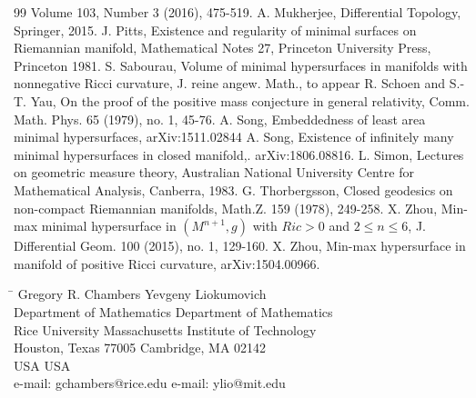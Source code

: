 \documentclass[12pt]{amsart}
\theoremstyle{definition}
\begin{document}
\begin{thebibliography}{99}
Volume 103, Number 3 (2016), 475-519.
 A. Mukherjee, Differential Topology, Springer, 2015.
 J. Pitts, Existence and regularity of minimal surfaces on Riemannian manifold, Mathematical
Notes 27, Princeton University Press, Princeton 1981.
 S. Sabourau, Volume of minimal hypersurfaces in manifolds with nonnegative Ricci curvature, J. reine angew. Math., to appear
 R. Schoen and S.-T. Yau, On the proof of the positive mass conjecture in general relativity, Comm. Math. Phys. 65 (1979), no. 1, 45-76.
  A. Song, Embeddedness of least area minimal hypersurfaces, arXiv:1511.02844
  A. Song, Existence of infinitely many minimal hypersurfaces in closed manifold,. arXiv:1806.08816.
 L. Simon, Lectures on geometric measure theory, Australian National University Centre for
Mathematical Analysis, Canberra, 1983.
  G. Thorbergsson, Closed geodesics on non-compact Riemannian manifolds, Math.Z. 159 (1978), 249-258.
 X. Zhou, Min-max minimal hypersurface in $(M^{n+1}, g)$ with $Ric>0$ and $2 \leq n \leq 6$,
J. Differential Geom. 100 (2015), no. 1, 129-160.
 X. Zhou, Min-max hypersurface in manifold of positive Ricci curvature, arXiv:1504.00966.
\end{thebibliography}


\begin{tabbing}
\hspace*{7.5cm}\=\kill
Gregory R. Chambers                 \> Yevgeny Liokumovich\\
Department of Mathematics           \> Department of Mathematics\\
Rice University                     \> Massachusetts Institute of Technology\\
Houston, Texas 77005             \> Cambridge, MA 02142\\
USA                                 \> USA\\
e-mail: gchambers@rice.edu      \> e-mail: ylio@mit.edu\\
\end{tabbing}
\end{document}
